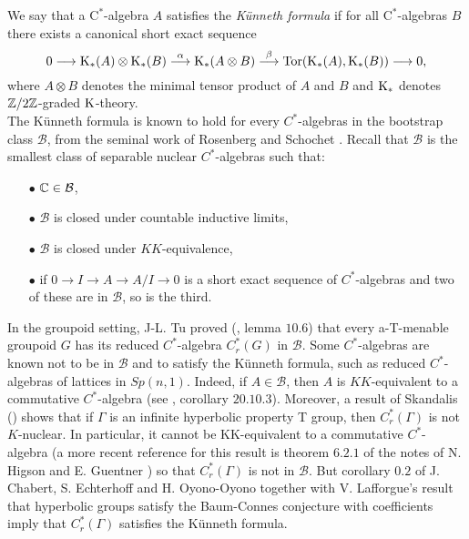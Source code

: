 We say that a $\mathrm{C}^*$-algebra $A$ satisfies the \textit{Künneth formula} if for all $\mathrm{C}^*$-algebras $B$ there exists a canonical short exact sequence
	\begin{equation} \label{KunnethSequence}	
0\longrightarrow \mathrm K_*(A)\otimes \mathrm K_*(B)\stackrel{\alpha}{\longrightarrow}\mathrm K_*(A\otimes B)\stackrel{\beta}{\longrightarrow}\mathrm{Tor}(\mathrm K_*(A),\mathrm K_*(B))\longrightarrow 0,
	\end{equation}
	where $A\otimes B$ denotes the minimal tensor product of $A$ and $B$ and $\mathrm K_*$ denotes $\mathbb Z /2\mathbb Z$-graded $\mathrm K$-theory. \\

The Künneth formula is known to hold for every $C^*$-algebras in the bootstrap class $\mathcal B$, from the seminal work of Rosenberg and Schochet \cite{RosenbergKunneth}. Recall that $\mathcal B$ is the smallest class of separable nuclear $C^*$-algebras such that:
\begin{itemize}
\item[$\bullet$] $\mathbb C \in \mathcal B$,
\item[$\bullet$] $\mathcal B$ is closed under countable inductive limits,  
\item[$\bullet$] $\mathcal B$ is closed under $KK$-equivalence,
\item[$\bullet$] if $0 \rightarrow I \rightarrow A \rightarrow A/I \rightarrow 0$ is a short exact sequence of $C^*$-algebras and two of these are in $\mathcal B$, so is the third. 
\end{itemize}
In the groupoid setting, J-L. Tu proved (\cite{TuThese}, lemma $10.6$) that every a-T-menable groupoid $G$ has its reduced $C^*$-algebra $C^*_r(G)$ in $\mathcal B$. Some $C^*$-algebras are known not to be in $\mathcal B$ and to satisfy the Künneth formula, such as reduced $C^*$-algebras of lattices in $Sp(n,1)$. Indeed, if $A\in \mathcal B$, then $A$ is $KK$-equivalent to a commutative $C^*$-algebra (see \cite{blackadar}, corollary $20.10.3$). Moreover, a result of Skandalis (\cite{SkandalisNotion}) shows that if $\Gamma$ is an infinite hyperbolic property T group, then $C^*_r(\Gamma)$ is not $K$-nuclear. In particular, it cannot be KK-equivalent to a commutative $C^*$-algebra (a more recent reference for this result is theorem $6.2.1$ of the notes of N. Higson and E. Guentner \cite{HigsonGuentnerNotes}) so that $C^*_r(\Gamma)$ is not in $\mathcal B$. But corollary $0.2$ of J. Chabert, S. Echterhoff and H. Oyono-Oyono \cite{ChabertEOY} together with V. Lafforgue's result \cite{lafforgue2012conjecture} that hyperbolic groups satisfy the Baum-Connes conjecture with coefficients imply that $C^*_r(\Gamma)$ satisfies the Künneth formula.\\

